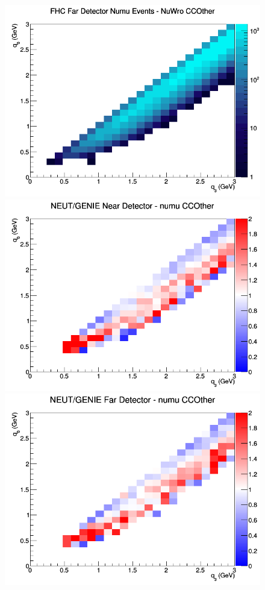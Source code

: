 \documentclass[12pt]{article}
\begin{document}
\begin{figure}[h]
\endminipage
{}
\includegraphics[width=\linewidth]{q0_q3/nominal/CCOther_FHC_FD_numu_q3_q0_NuWro.png}
\endminipage
\newline
{}
\includegraphics[width=\linewidth]{q0_q3/nominal/ratios/CCOther_NEUT_GENIE_numu_near_q3_q0.png}
\endminipage
{}
\includegraphics[width=\linewidth]{q0_q3/nominal/ratios/CCOther_NEUT_GENIE_numu_far_q3_q0.png}

\end{figure}
\end{document}
